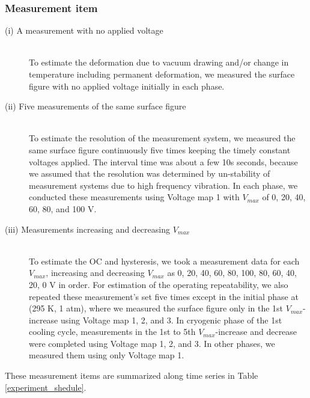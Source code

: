 \documentclass[a4paper]{article}
\begin{document}
\subsubsection{Measurement item}
\begin{description}
\item[(i) A measurement with no applied voltage] \mbox{}\\
To estimate the deformation due to vacuum drawing and/or change in temperature including permanent deformation, we measured the surface figure with no applied voltage initially in each phase.
\item[(ii) Five measurements of the same surface figure] \mbox{}\\
To estimate the resolution of the measurement system, we measured the same surface figure continuously five times keeping the timely constant voltages applied. The interval time was about a few 10s seconds, because we assumed that the resolution was determined by un-stability of measurement systems due to high frequency vibration. In each phase, we conducted these measurements using Voltage map 1 with $V_{max}$ of 0, 20, 40, 60, 80, and 100 V.
\item[(iii) Measurements increasing and decreasing $V_{max}$] \mbox{}\\
To estimate the OC and hysteresis, we took a measurement data for each $V_{max}$, increasing and decreasing $V_{max}$ as 0, 20, 40, 60, 80, 100, 80, 60, 40, 20, 0 V in order. For estimation of the operating repeatability, we also repeated these measurement's set five times except in the initial phase at (295 K, 1 atm), where we measured the surface figure only in the 1st $V_{max}$-increase using Voltage map 1, 2, and 3. In cryogenic phase of the 1st cooling cycle, measurements in the 1st to 5th $V_{max}$-increase and decrease were completed using Voltage map 1, 2, and 3. In other phases, we measured them using only Voltage map 1.
\end{description}

These measurement items are summarized along time series in Table \ref{experiment_shedule}. 
\end{document}
